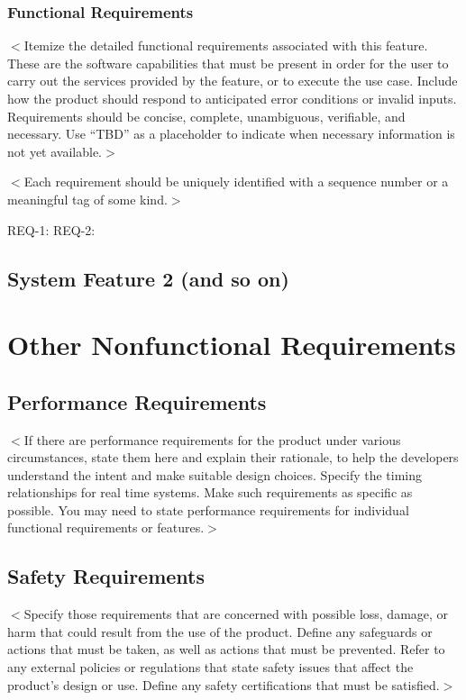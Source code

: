\documentclass{scrreprt}
\begin{document}
\subsection{Functional Requirements}
$<$Itemize the detailed functional requirements associated with this feature.  
These are the software capabilities that must be present in order for the user 
to carry out the services provided by the feature, or to execute the use case.  
Include how the product should respond to anticipated error conditions or 
invalid inputs. Requirements should be concise, complete, unambiguous, 
verifiable, and necessary. Use “TBD” as a placeholder to indicate when necessary 
information is not yet available.$>$

$<$Each requirement should be uniquely identified with a sequence number or a 
meaningful tag of some kind.$>$

REQ-1:	REQ-2:

\section{System Feature 2 (and so on)}


\chapter{Other Nonfunctional Requirements}

\section{Performance Requirements}
$<$If there are performance requirements for the product under various 
circumstances, state them here and explain their rationale, to help the 
developers understand the intent and make suitable design choices. Specify the 
timing relationships for real time systems. Make such requirements as specific 
as possible. You may need to state performance requirements for individual 
functional requirements or features.$>$

\section{Safety Requirements}
$<$Specify those requirements that are concerned with possible loss, damage, or 
harm that could result from the use of the product. Define any safeguards or 
actions that must be taken, as well as actions that must be prevented. Refer to 
any external policies or regulations that state safety issues that affect the 
product’s design or use. Define any safety certifications that must be 
satisfied.$>$
\end{document}
